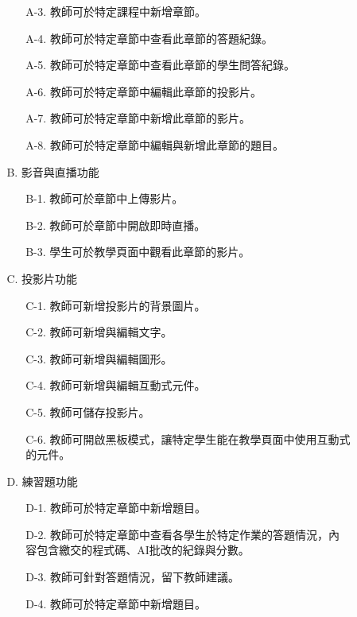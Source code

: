 \documentclass[12pt]{article}
\begin{document}
\begin{enumerate}
\begin{enumerate}
\begin{enumerate}
\begin{enumerate}
              \item [A-3.] 教師可於特定課程中新增章節。
              \item [A-4.] 教師可於特定章節中查看此章節的答題紀錄。
              \item [A-5.] 教師可於特定章節中查看此章節的學生問答紀錄。
              \item [A-6.] 教師可於特定章節中編輯此章節的投影片。
              \item [A-7.] 教師可於特定章節中新增此章節的影片。
              \item [A-8.] 教師可於特定章節中編輯與新增此章節的題目。
            \end{enumerate}
          \item [B.] 影音與直播功能
            \begin{enumerate}
              \item [B-1.] 教師可於章節中上傳影片。
              \item [B-2.] 教師可於章節中開啟即時直播。
              \item [B-3.] 學生可於教學頁面中觀看此章節的影片。
            \end{enumerate}
          \item [C.] 投影片功能
            \begin{enumerate}
              \item [C-1.] 教師可新增投影片的背景圖片。
              \item [C-2.] 教師可新增與編輯文字。
              \item [C-3.] 教師可新增與編輯圖形。
              \item [C-4.] 教師可新增與編輯互動式元件。
              \item [C-5.] 教師可儲存投影片。
              \item [C-6.] 教師可開啟黑板模式，讓特定學生能在教學頁面中使用互動式的元件。
            \end{enumerate}
          \item [D.] 練習題功能
            \begin{enumerate}
              \item [D-1.] 教師可於特定章節中新增題目。
              \item [D-2.] 教師可於特定章節中查看各學生於特定作業的答題情況，內容包含繳交的程式碼、AI批改的紀錄與分數。
              \item [D-3.] 教師可針對答題情況，留下教師建議。
              \item [D-4.] 教師可於特定章節中新增題目。

\end{enumerate}
\end{enumerate}
\end{enumerate}
\end{enumerate}
\end{document}
